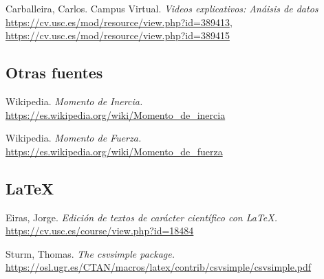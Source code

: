 \documentclass[12pt, a4paper, titlepage]{article}
\begin{document}
  Carballeira, Carlos. Campus Virtual. \textit{Videos explicativos: Anáisis de datos} \url{https://cv.usc.es/mod/resource/view.php?id=389413}, \url{https://cv.usc.es/mod/resource/view.php?id=389415}

  \subsection*{Otras fuentes}

  Wikipedia. \textit{Momento de Inercia.} \url{https://es.wikipedia.org/wiki/Momento_de_inercia}

  Wikipedia. \textit{Momento de Fuerza.} \url{https://es.wikipedia.org/wiki/Momento_de_fuerza}

  \subsection*{LaTeX}

  Eiras, Jorge. \textit{Edición de textos de carácter científico con LaTeX.} \url{https://cv.usc.es/course/view.php?id=18484}

  Sturm, Thomas. \textit{The csvsimple package.} \url{https://osl.ugr.es/CTAN/macros/latex/contrib/csvsimple/csvsimple.pdf}
\end{document}
